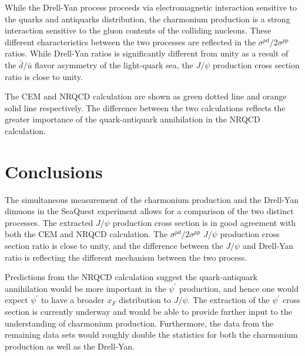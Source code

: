 \documentclass[10pt, a4paper,final]{article}
\begin{document}
While the Drell-Yan process proceeds via electromagnetic interaction sensitive
to the quarks and antiquarks distribution, the charmonium production is a strong
interaction sensitive to the gluon contents of the colliding nucleons. These
different characteristics between the two processes are reflected in the
$\sigma^{pd}/2\sigma^{pp}$ ratios. While Drell-Yan ratios is significantly different
from unity as a result of the $\bar{d}/\bar{u}$ flavor asymmetry of the light-quark sea,
the $J/\psi$ production cross section ratio is close to unity.

The CEM and NRQCD calculation are shown as green dotted line and orange solid line
respectively. The difference between the two calculations reflects the greater
importance of the quark-antiquark annihilation in the NRQCD calculation.

\section{Conclusions}
The simultaneous measurement of the charmonium production and the Drell-Yan dimuons
in the SeaQuest experiment allows for a comparison of the two distinct processes. The
extracted $J/\psi$ production cross section is in good agreement with both the CEM
and NRQCD calculation. The $\sigma^{pd}/2\sigma^{pp}$ $J/\psi$ production cross section ratio
is close to unity, and the difference between the $J/\psi$ and Drell-Yan
ratio is reflecting the different mechanism between the two process.

Predictions from the NRQCD calculation suggest the quark-antiquark annihilation would
be more important in the $\psi^\prime$ production, and hence one would expect $\psi^\prime$
to have a broader $x_F$ distribution to $J/\psi$. The extraction of the $\psi^\prime$
cross section is currently underway and would be able to provide further input to
the understanding of charmonium production. Furthermore, the data from the remaining
data sets would roughly double the statistics for both the charmonium production as well as the Drell-Yan.

\printbibliography[heading=bibintoc,title={References}]
\listoftodos
\end{document}
